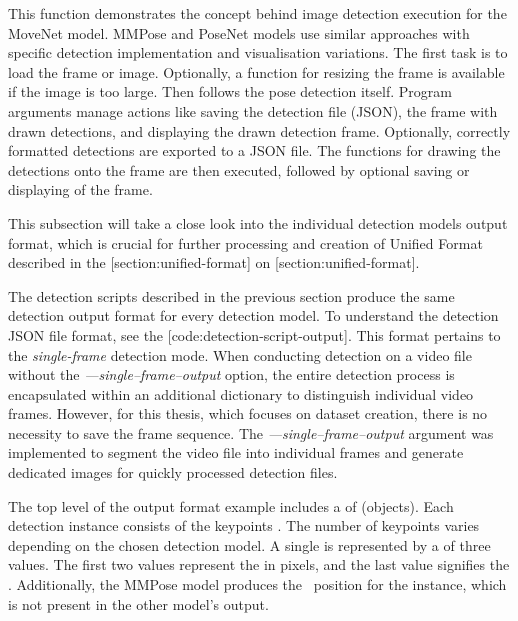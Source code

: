 
This function demonstrates the concept behind image detection execution for the MoveNet model. MMPose and PoseNet models use similar approaches with specific detection implementation and visualisation variations. The first task is to load the frame or image. Optionally, a function for resizing the frame is available if the image is too large. Then follows the pose detection itself. Program arguments manage actions like saving the detection file (JSON), the frame with drawn detections, and displaying the drawn detection frame. Optionally, correctly formatted detections are exported to a JSON file. The functions for drawing the detections onto the frame are then executed, followed by optional saving or displaying of the frame. 


This subsection will take a close look into the individual detection models output format, which is crucial for further processing and creation of Unified Format described in the [section:unified-format] on [section:unified-format].

The detection scripts described in the previous section produce the same detection output format for every detection model. To understand the detection JSON file format, see the [code:detection-script-output]. This format pertains to the {\em single-frame} detection mode. When conducting detection on a video file without the {\em ---single--frame--output} option, the entire detection process is encapsulated within an additional dictionary to distinguish individual video frames. However, for this thesis, which focuses on dataset creation, there is no necessity to save the frame sequence. The {\em---single--frame--output} argument was implemented to segment the video file into individual frames and generate dedicated images for quickly processed detection files.


The top level of the output format example includes a  of  (objects). Each detection instance consists of the keypoints . The number of keypoints varies depending on the chosen detection model. A single  is represented by a  of three  values. The first two values represent the  in pixels, and the last value signifies the . Additionally, the MMPose model produces the \BBOX\ position for the instance, which is not present in the other model's output.

